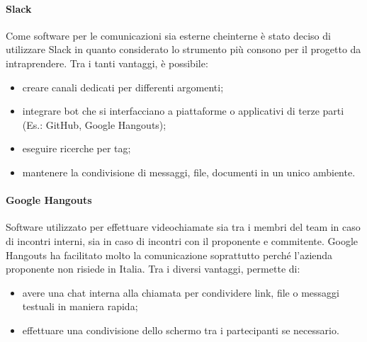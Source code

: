 	\paragraph{Slack}
	Come software per le comunicazioni sia esterne cheinterne è stato deciso di utilizzare Slack in quanto considerato lo strumento più consono per il progetto da intraprendere.
	Tra i tanti vantaggi, è possibile:
	\begin{itemize}
		\item creare canali dedicati per differenti argomenti;
		\item integrare bot che si interfacciano a piattaforme o applicativi di terze parti (Es.: GitHub, Google Hangouts);
		\item eseguire ricerche per tag;
		\item mantenere la condivisione di messaggi, file, documenti in un unico ambiente.
	\end{itemize}
	
	\paragraph{Google Hangouts}
	Software utilizzato per effettuare videochiamate sia tra i membri del team in caso di incontri interni, sia in caso di incontri con il proponente e commitente. Google Hangouts ha facilitato molto la comunicazione soprattutto perché l'azienda proponente non risiede in Italia.
	Tra i diversi vantaggi, permette di:
	\begin{itemize}
		\item avere una chat interna alla chiamata per condividere link, file o messaggi testuali in maniera rapida;
		\item effettuare una condivisione dello schermo tra i partecipanti se necessario.
	\end{itemize}